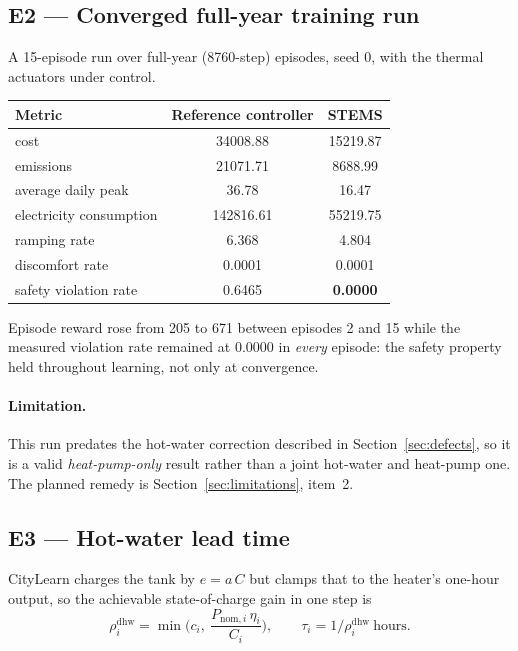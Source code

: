 \documentclass[11pt]{article}
\begin{document}
\subsection{E2 --- Converged full-year training run}
\label{sec:exp-converged}

A 15-episode run over full-year (8760-step) episodes, seed 0, with the thermal
actuators under control.

\begin{center}
\begin{tabular}{lcc}
\toprule
Metric & Reference controller & STEMS \\
\midrule
cost & 34008.88 & 15219.87 \\
emissions & 21071.71 & 8688.99 \\
average daily peak & 36.78 & 16.47 \\
electricity consumption & 142816.61 & 55219.75 \\
ramping rate & 6.368 & 4.804 \\
discomfort rate & 0.0001 & 0.0001 \\
safety violation rate & 0.6465 & \textbf{0.0000} \\
\bottomrule
\end{tabular}
\end{center}

Episode reward rose from 205 to 671 between episodes 2 and 15 while the measured
violation rate remained at $0.0000$ in \emph{every} episode: the safety property
held throughout learning, not only at convergence.

\paragraph{Limitation.} This run predates the hot-water correction described in
Section~\ref{sec:defects}, so it is a valid \emph{heat-pump-only} result rather
than a joint hot-water and heat-pump one. The planned remedy is
Section~\ref{sec:limitations}, item~2.

\subsection{E3 --- Hot-water lead time}
\label{sec:exp-leadtime}

CityLearn charges the tank by $e = a\,C$ but clamps that to the heater's
one-hour output, so the achievable state-of-charge gain in one step is
\begin{equation}
\rho^{\text{dhw}}_i = \min\!\Big(c_i,\ \frac{P_{\text{nom},i}\,\eta_i}{C_i}\Big),
\qquad \tau_i = 1/\rho^{\text{dhw}}_i \ \text{hours}.
\label{eq:dhw-rate}
\end{equation}
\end{document}
